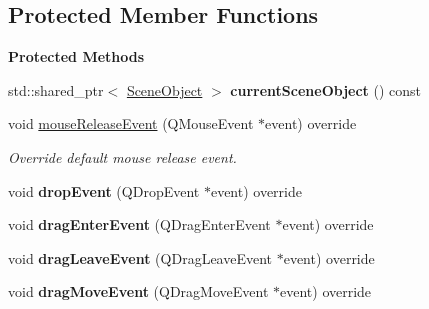 \subsection*{Protected Member Functions}
\begin{Indent}\textbf{ Protected Methods}\par
\begin{DoxyCompactItemize}
\item 
\mbox{\label{classrev_1_1_view_1_1_component_tree_widget_a72be50e22be72a13264d747e4f5709fc}} 
std\+::shared\+\_\+ptr$<$ \mbox{\hyperlink{classrev_1_1_scene_object}{Scene\+Object}} $>$ {\bfseries current\+Scene\+Object} () const
\item 
\mbox{\label{classrev_1_1_view_1_1_component_tree_widget_aaece5ded070c0d0b90c8b5de104512ae}} 
void \mbox{\hyperlink{classrev_1_1_view_1_1_component_tree_widget_aaece5ded070c0d0b90c8b5de104512ae}{mouse\+Release\+Event}} (Q\+Mouse\+Event $\ast$event) override
\begin{DoxyCompactList}\small\item\em Override default mouse release event. \end{DoxyCompactList}\item 
\mbox{\label{classrev_1_1_view_1_1_component_tree_widget_aae2fd57dd879cd3485cd28ba4f9f95a4}} 
void {\bfseries drop\+Event} (Q\+Drop\+Event $\ast$event) override
\item 
\mbox{\label{classrev_1_1_view_1_1_component_tree_widget_a16cf05068c372ac76821a1152894027e}} 
void {\bfseries drag\+Enter\+Event} (Q\+Drag\+Enter\+Event $\ast$event) override
\item 
\mbox{\label{classrev_1_1_view_1_1_component_tree_widget_aca96f792dcb1c47553ad14a0b3df028e}} 
void {\bfseries drag\+Leave\+Event} (Q\+Drag\+Leave\+Event $\ast$event) override
\item 
\mbox{\label{classrev_1_1_view_1_1_component_tree_widget_a1d8ca5e71dd2febe98cea3716a9f713a}} 
void {\bfseries drag\+Move\+Event} (Q\+Drag\+Move\+Event $\ast$event) override

\end{DoxyCompactItemize}
\end{Indent}
